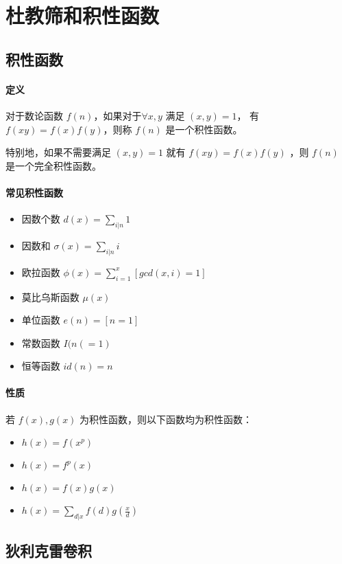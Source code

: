 \section{杜教筛和积性函数}

\subsection{积性函数}

\paragraph{定义} 对于数论函数 $f(n)$，如果对于$\forall x, y$ 满足 $(x, y) = 1$， 有 $f(xy) = f(x)f(y)$，则称 $f(n)$ 是一个积性函数。
\noindent \par 特别地，如果不需要满足 $(x, y) = 1$ 就有 $f(xy) = f(x)f(y)$ ，则 $f(n)$ 是一个完全积性函数。

\paragraph{常见积性函数}
\begin{itemize}
    \item 因数个数 $d(x) = \sum_{i|n} 1$
    \item 因数和 $\sigma(x) = \sum_{i|n} i$
    \item 欧拉函数 $\phi(x) = \sum_{i=1}^x [gcd(x, i) = 1]$
    \item 莫比乌斯函数 $\mu(x)$
    \item 单位函数 $e(n) = [n = 1]$
    \item 常数函数 $I(n( = 1)$
    \item 恒等函数 $id(n) = n$
\end{itemize}

\paragraph{性质} 若 $f(x), g(x)$ 为积性函数，则以下函数均为积性函数：
\begin{itemize}
    \item $h(x) = f(x^p)$
    \item $h(x) = f^p(x)$
    \item $h(x) = f(x)g(x)$
    \item $h(x) = \sum_{d|x} f(d)g(\frac{x}{d})$
\end{itemize}

\subsection{狄利克雷卷积}

